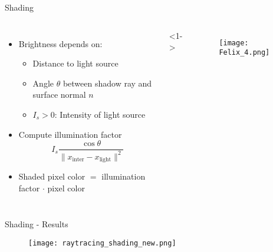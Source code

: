 \begin{frame}{Shading}
    \begin{columns}
        \begin{itemize}
        \item<1-> Brightness depends on: 
        \begin{itemize}
            \item Distance to light source
            \item Angle $\theta$ between shadow ray and surface normal $n$
            \item $I_s > 0$: Intensity of light source
        \end{itemize}
        \item<2-> Compute illumination factor 
        $$
        I_s \frac{\cos \theta}{\|x_{\text{inter}} - x_{\text{light}}\|^2}
        $$
        \item<3-> Shaded pixel color $=$ illumination factor $\cdot$ pixel color
        \end{itemize}
        <1->
        \begin{figure}
                \centering
                \texttt{[image: Felix\_4.png]}
            \end{figure}
    \end{columns}
\end{frame}

\begin{frame}{Shading - Results}
    \begin{figure}
                \centering
                \texttt{[image: raytracing\_shading\_new.png]}
            \end{figure}
\end{frame}


